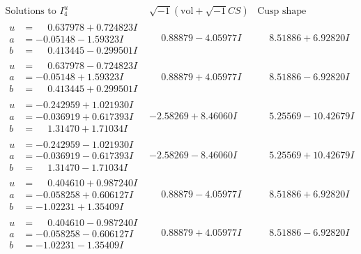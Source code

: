 \documentclass[1p]{elsarticle_modified}
\theoremstyle{definition}
\newcommand{\I}{\sqrt{-1}}
\begin{document}
$$\begin{array}{c|c|c}  
\text{Solutions to }I^u_{4}& \I (\text{vol} + \sqrt{-1}CS) & \text{Cusp shape}\\
 \hline 
\begin{aligned}
u &= \phantom{-}0.637978 + 0.724823 I \\
a &= -0.05148 - 1.59323 I \\
b &= \phantom{-}0.413445 - 0.299501 I\end{aligned}
 & \phantom{-}0.88879 - 4.05977 I & \phantom{-}8.51886 + 6.92820 I \\ \hline\begin{aligned}
u &= \phantom{-}0.637978 - 0.724823 I \\
a &= -0.05148 + 1.59323 I \\
b &= \phantom{-}0.413445 + 0.299501 I\end{aligned}
 & \phantom{-}0.88879 + 4.05977 I & \phantom{-}8.51886 - 6.92820 I \\ \hline\begin{aligned}
u &= -0.242959 + 1.021930 I \\
a &= -0.036919 + 0.617393 I \\
b &= \phantom{-}1.31470 + 1.71034 I\end{aligned}
 & -2.58269 + 8.46060 I & \phantom{-}5.25569 - 10.42679 I \\ \hline\begin{aligned}
u &= -0.242959 - 1.021930 I \\
a &= -0.036919 - 0.617393 I \\
b &= \phantom{-}1.31470 - 1.71034 I\end{aligned}
 & -2.58269 - 8.46060 I & \phantom{-}5.25569 + 10.42679 I \\ \hline\begin{aligned}
u &= \phantom{-}0.404610 + 0.987240 I \\
a &= -0.058258 + 0.606127 I \\
b &= -1.02231 + 1.35409 I\end{aligned}
 & \phantom{-}0.88879 - 4.05977 I & \phantom{-}8.51886 + 6.92820 I \\ \hline\begin{aligned}
u &= \phantom{-}0.404610 - 0.987240 I \\
a &= -0.058258 - 0.606127 I \\
b &= -1.02231 - 1.35409 I\end{aligned}
 & \phantom{-}0.88879 + 4.05977 I & \phantom{-}8.51886 - 6.92820 I \\ \hline\begin{aligned}

\end{aligned}
\end{array}$$
\end{document}
